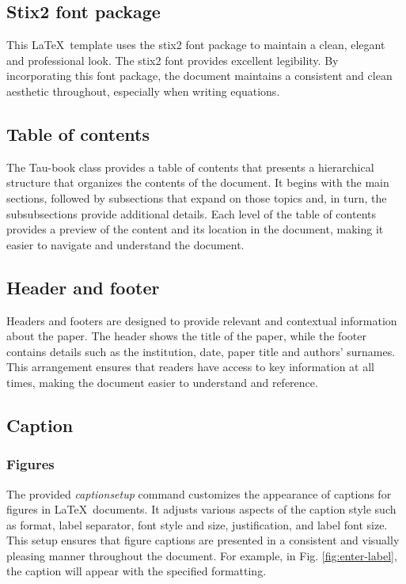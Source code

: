 \documentclass[10pt,a4paper,twoside]{main}
\begin{document}
    \subsection{Stix2 font package}

        This \LaTeX\ template uses the stix2 font package to maintain a clean, elegant and professional look. The stix2 font provides excellent legibility. By incorporating this font package, the document maintains a consistent and clean aesthetic throughout, especially when writing equations.

    \subsection{Table of contents}

        The Tau-book class provides a table of contents that presents a hierarchical structure that organizes the contents of the document. It begins with the main sections, followed by subsections that expand on those topics and, in turn, the subsubsections provide additional details. Each level of the table of contents provides a preview of the content and its location in the document, making it easier to navigate and understand the document.

    \subsection{Header and footer}

        Headers and footers are designed to provide relevant and contextual information about the paper. The header shows the title of the paper, while the footer contains details such as the institution, date, paper title and authors' surnames. This arrangement ensures that readers have access to key information at all times, making the document easier to understand and reference.

    \subsection{Caption}

        \subsubsection{Figures}

            The provided \textit{captionsetup} command customizes the appearance of captions for figures in \LaTeX\ documents. It adjusts various aspects of the caption style such as format, label separator, font style and size, justification, and label font size. This setup ensures that figure captions are presented in a consistent and visually pleasing manner throughout the document. For example, in Fig. \ref{fig:enter-label}, the caption will appear with the specified formatting.
\end{document}
